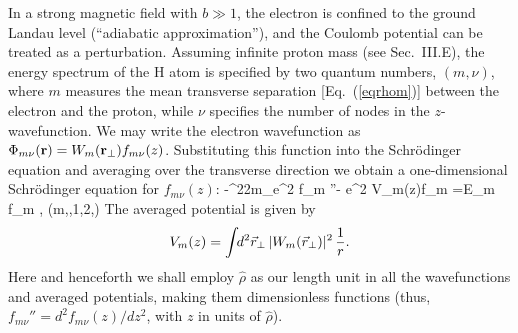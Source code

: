In a strong magnetic field with $b\gg 1$, the
electron is confined to the ground Landau level (``adiabatic 
approximation''), and the Coulomb potential can be treated as a 
perturbation. Assuming infinite proton mass (see Sec.~III.E),
the energy spectrum of the H atom is specified by 
two quantum numbers,
$(m,\nu)$, where $m$ measures the mean transverse separation
[Eq.~(\ref{eqrhom})] between the electron and the proton,
while $\nu$ specifies the number of nodes in the $z$-wavefunction. 
We may write the electron wavefunction as 
$\Phi_{m\nu}({\bf r})=W_m({\bf r}_{\perp})f_{m\nu}(z)$. 
Substituting this function into the 
Schr\"odinger equation and averaging over the transverse
direction we obtain a one-dimensional Schr\"odinger equation for $f_{m\nu}(z)$:
\be
-{\hbar^2\over 2m_e\hat\rho^2} f_{m \nu}''- {e^2 \over \hat\rho}
V_m(z)f_{m \nu}=E_{m \nu} f_{m \nu},\qquad
(m,,1,2,\cdots)
\label{eqsch}\ee
The averaged potential is given by
\begin{equation}
V_m(z)=\int \!\! d^2 \vec r_{\perp}\, |W_m (\vec r_{\perp})|^2\, {1 \over r}.
\label{eqvm}\end{equation}
Here and henceforth we shall employ $\hat \rho$ as our length unit in all the 
wavefunctions and averaged potentials, 
making them dimensionless functions (thus, $f_{m\nu}''=d^2f_{m\nu}(z)/dz^2$,
with $z$ in units of $\hat\rho$). 

